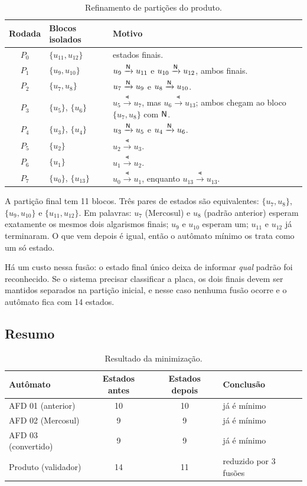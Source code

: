 \begin{table}[ht]
\centering
\small
\renewcommand{\arraystretch}{1.3}
\begin{tabular}{c p{3.4cm} p{7.6cm}}
\toprule
Rodada & Blocos isolados & Motivo \\
\midrule
$P_0$ & $\{u_{11},u_{12}\}$ & estados finais. \\
$P_1$ & $\{u_9,u_{10}\}$ & $u_9 \xrightarrow{\mathsf{N}} u_{11}$ e $u_{10} \xrightarrow{\mathsf{N}} u_{12}$, ambos finais. \\
$P_2$ & $\{u_7,u_8\}$ & $u_7 \xrightarrow{\mathsf{N}} u_9$ e $u_8 \xrightarrow{\mathsf{N}} u_{10}$. \\
$P_3$ & $\{u_5\}$, $\{u_6\}$ & $u_5 \xrightarrow{\Lt} u_7$, mas $u_6 \xrightarrow{\Lt} u_{13}$; ambos chegam ao bloco $\{u_7,u_8\}$ com $\mathsf{N}$. \\
$P_4$ & $\{u_3\}$, $\{u_4\}$ & $u_3 \xrightarrow{\mathsf{N}} u_5$ e $u_4 \xrightarrow{\mathsf{N}} u_6$. \\
$P_5$ & $\{u_2\}$ & $u_2 \xrightarrow{\Lt} u_3$. \\
$P_6$ & $\{u_1\}$ & $u_1 \xrightarrow{\Lt} u_2$. \\
$P_7$ & $\{u_0\}$, $\{u_{13}\}$ & $u_0 \xrightarrow{\Lt} u_1$, enquanto $u_{13} \xrightarrow{\Lt} u_{13}$. \\
\bottomrule
\end{tabular}
\caption{Refinamento de partições do produto.}
\label{tab:min3}
\end{table}

A partição final tem 11 blocos. Três pares de estados são
equivalentes: $\{u_7,u_8\}$, $\{u_9,u_{10}\}$ e $\{u_{11},u_{12}\}$.
Em palavras: $u_7$ (Mercosul) e $u_8$ (padrão anterior) esperam
exatamente os mesmos dois algarismos finais; $u_9$ e $u_{10}$
esperam um; $u_{11}$ e $u_{12}$ já terminaram. O que vem depois é
igual, então o autômato mínimo os trata como um só estado.

Há um custo nessa fusão: o estado final único deixa de informar
\emph{qual} padrão foi reconhecido. Se o sistema precisar
classificar a placa, os dois finais devem ser mantidos separados na
partição inicial, e nesse caso nenhuma fusão ocorre e o autômato
fica com 14 estados.


\subsection{Resumo}

\begin{table}[ht]
\centering
\renewcommand{\arraystretch}{1.2}
\begin{tabular}{lccl}
\toprule
Autômato & Estados antes & Estados depois & Conclusão \\
\midrule
AFD 01 (anterior)     & 10 & 10 & já é mínimo \\
AFD 02 (Mercosul)     & 9  & 9  & já é mínimo \\
AFD 03 (convertido)   & 9  & 9  & já é mínimo \\
Produto (validador)   & 14 & 11 & reduzido por 3 fusões \\
\bottomrule
\end{tabular}
\caption{Resultado da minimização.}
\label{tab:resumo-min}
\end{table}